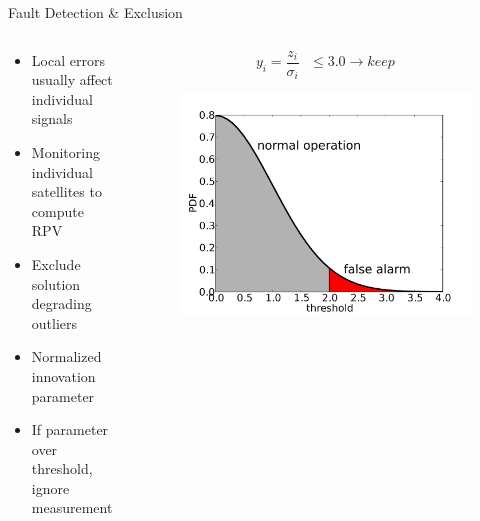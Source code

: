 \documentclass{beamer}
\begin{document}
    \begin{frame}{Fault Detection \& Exclusion}
      \begin{columns}
        \begin{column}{0.5\linewidth}
          \begin{itemize} \footnotesize
            \item Local errors usually affect individual signals
            \item Monitoring individual satellites to compute RPV
            \item Exclude solution degrading outliers
            \vfill
            \item Normalized innovation parameter
            \item If parameter over threshold, ignore measurement
          \end{itemize}
        \end{column}
        \begin{column}{0.5\linewidth}
          \begin{displaymath}
            y_i=\frac{z_i}{\sigma_i} ~~~\le 3.0 \rightarrow keep
          \end{displaymath}
          \begin{figure}[ht] \centering 
            \includegraphics[width=\textwidth]{../graphics/fde_plot.png}
          \end{figure}
        \end{column}
      \end{columns}
    \end{frame}
\end{document}
